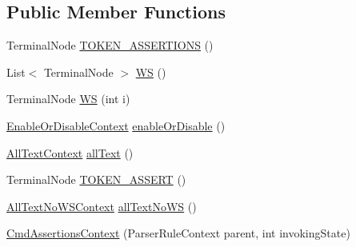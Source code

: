 \subsection*{Public Member Functions}
\begin{DoxyCompactItemize}
\item 
Terminal\+Node \hyperlink{classgov_1_1nasa_1_1jpf_1_1inspector_1_1client_1_1parser_1_1_console_grammar_parser_1_1_cmd_assertions_context_adf9119b4e2bd5a4cd02dda8c9bb5beb7}{T\+O\+K\+E\+N\+\_\+\+A\+S\+S\+E\+R\+T\+I\+O\+NS} ()
\item 
List$<$ Terminal\+Node $>$ \hyperlink{classgov_1_1nasa_1_1jpf_1_1inspector_1_1client_1_1parser_1_1_console_grammar_parser_1_1_cmd_assertions_context_a7861f488e433f5307cbbb068d2071918}{WS} ()
\item 
Terminal\+Node \hyperlink{classgov_1_1nasa_1_1jpf_1_1inspector_1_1client_1_1parser_1_1_console_grammar_parser_1_1_cmd_assertions_context_a2f1a70444c2a208861c6322d56608fed}{WS} (int i)
\item 
\hyperlink{classgov_1_1nasa_1_1jpf_1_1inspector_1_1client_1_1parser_1_1_console_grammar_parser_1_1_enable_or_disable_context}{Enable\+Or\+Disable\+Context} \hyperlink{classgov_1_1nasa_1_1jpf_1_1inspector_1_1client_1_1parser_1_1_console_grammar_parser_1_1_cmd_assertions_context_a27731d6a0ffd5c6d62506e1888ba07db}{enable\+Or\+Disable} ()
\item 
\hyperlink{classgov_1_1nasa_1_1jpf_1_1inspector_1_1client_1_1parser_1_1_console_grammar_parser_1_1_all_text_context}{All\+Text\+Context} \hyperlink{classgov_1_1nasa_1_1jpf_1_1inspector_1_1client_1_1parser_1_1_console_grammar_parser_1_1_cmd_assertions_context_a728231a0f35f6897fec1353f7f852f6b}{all\+Text} ()
\item 
Terminal\+Node \hyperlink{classgov_1_1nasa_1_1jpf_1_1inspector_1_1client_1_1parser_1_1_console_grammar_parser_1_1_cmd_assertions_context_aa5e0a7ee35b6276bdce8f86297de4a5a}{T\+O\+K\+E\+N\+\_\+\+A\+S\+S\+E\+RT} ()
\item 
\hyperlink{classgov_1_1nasa_1_1jpf_1_1inspector_1_1client_1_1parser_1_1_console_grammar_parser_1_1_all_text_no_w_s_context}{All\+Text\+No\+W\+S\+Context} \hyperlink{classgov_1_1nasa_1_1jpf_1_1inspector_1_1client_1_1parser_1_1_console_grammar_parser_1_1_cmd_assertions_context_aea45e3fc20ab859c256d0d050d72602e}{all\+Text\+No\+WS} ()
\item 
\hyperlink{classgov_1_1nasa_1_1jpf_1_1inspector_1_1client_1_1parser_1_1_console_grammar_parser_1_1_cmd_assertions_context_a373523c4853f4cd2c7e888c17a3774a3}{Cmd\+Assertions\+Context} (Parser\+Rule\+Context parent, int invoking\+State)

\end{DoxyCompactItemize}
